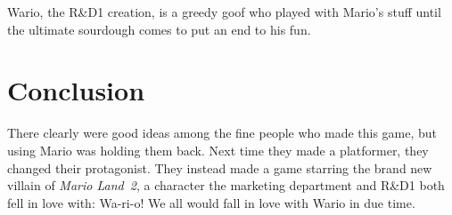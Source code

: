 \documentclass{book}
\begin{document}
Wario, the R\&D1 creation, is a greedy goof who played with Mario’s stuff until the ultimate sourdough comes to put an end to his fun.\par
\FloatBarrier\section*{Conclusion}
There clearly were good ideas among the fine people who made this game, but using Mario was holding them back. Next time they made a platformer, they changed their protagonist. They instead made a game starring the brand new villain of \emph{Mario Land~2}, a character the marketing department and R\&D1 both fell in love with: Wa-ri-o! We all would fall in love with Wario in due time.\par
\FloatBarrier\vspace{\baselineskip}\begin{figure}[H]\end{figure}
\end{document}
